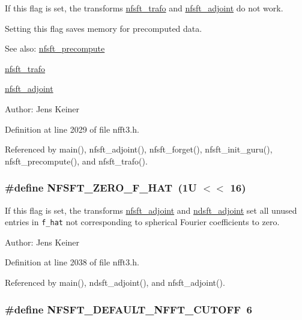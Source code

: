 If this flag is set, the transforms \hyperlink{group__nfsft_g5796fc68c432d46dfcab7abd8c56ee22}{nfsft\_\-trafo} and \hyperlink{group__nfsft_g813bb48d404c7286310733c99a81a169}{nfsft\_\-adjoint} do not work. 

Setting this flag saves memory for precomputed data.

\begin{Desc}
\item[See also:]\hyperlink{group__nfsft_gbe87aeea1f7cfef9ae8febb16d702f3b}{nfsft\_\-precompute} 

\hyperlink{group__nfsft_g5796fc68c432d46dfcab7abd8c56ee22}{nfsft\_\-trafo} 

\hyperlink{group__nfsft_g813bb48d404c7286310733c99a81a169}{nfsft\_\-adjoint} \end{Desc}
\begin{Desc}
\item[Author:]Jens Keiner \end{Desc}


Definition at line 2029 of file nfft3.h.

Referenced by main(), nfsft\_\-adjoint(), nfsft\_\-forget(), nfsft\_\-init\_\-guru(), nfsft\_\-precompute(), and nfsft\_\-trafo().\hypertarget{group__nfsft_g7797dfe75149e88ee680fc2579c31505}{
\subsubsection{\setlength{\rightskip}{0pt plus 5cm}\#define NFSFT\_\-ZERO\_\-F\_\-HAT~(1U $<$$<$ 16)}}
\label{group__nfsft_g7797dfe75149e88ee680fc2579c31505}


If this flag is set, the transforms \hyperlink{group__nfsft_g813bb48d404c7286310733c99a81a169}{nfsft\_\-adjoint} and \hyperlink{group__nfsft_g88c7be3ead1c726a1d5b8b903952c527}{ndsft\_\-adjoint} set all unused entries in {\tt f\_\-hat} not corresponding to spherical Fourier coefficients to zero. 

\begin{Desc}
\item[Author:]Jens Keiner \end{Desc}


Definition at line 2038 of file nfft3.h.

Referenced by main(), ndsft\_\-adjoint(), and nfsft\_\-adjoint().\hypertarget{group__nfsft_g206c4faaf800b49dcb14e26148fa9ac6}{
\subsubsection{\setlength{\rightskip}{0pt plus 5cm}\#define NFSFT\_\-DEFAULT\_\-NFFT\_\-CUTOFF~6}}
\label{group__nfsft_g206c4faaf800b49dcb14e26148fa9ac6}


